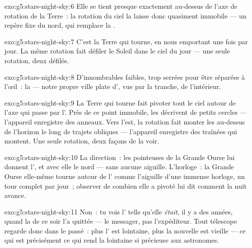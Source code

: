 \begin{solution}{exo:g5:stars-night-sky:6}
Elle se tient presque exactement au-dessus de l'axe de rotation de la
Terre~: la rotation du ciel la laisse donc quasiment immobile --- un
repère fixe du nord, qui remplace la .
\end{solution}

\begin{solution}{exo:g5:stars-night-sky:7}
C'est la Terre qui tourne, en nous emportant une fois par jour. La
même rotation fait défiler le Soleil dans le ciel du jour --- une
seule rotation, deux défilés.
\end{solution}

\begin{solution}{exo:g5:stars-night-sky:8}
D'innombrables  faibles, trop serrées pour être séparées à
l'œil~: la  --- notre propre ville plate d', vue
par la tranche, de l'intérieur.
\end{solution}

\begin{solution}{exo:g5:stars-night-sky:9}
La Terre qui tourne fait pivoter tout le ciel autour de l'axe qui
passe par l'. Près de ce point immobile, les 
décrivent de petits cercles --- l'appareil enregistre des anneaux.
Vers l'est, la rotation fait monter les  au-dessus de
l'horizon le long de trajets obliques --- l'appareil enregistre des
traînées qui montent. Une seule rotation, deux façons de la voir.
\end{solution}

\begin{solution}{exo:g5:stars-night-sky:10}
La direction~: les pointeuses de la Grande Ourse lui donnent l', et avec elle le nord --- sans aucune aiguille. L'horloge~:
la Grande Ourse elle-même tourne autour de l' comme
l'aiguille d'une immense horloge, un tour complet par jour~; observer
de combien elle a pivoté lui dit comment la nuit avance.
\end{solution}

\begin{solution}{exo:g5:stars-night-sky:11}
Non~: tu vois l' telle qu'elle \emph{était}, il y a des années,
quand la  de ce soir l'a quittée --- le messager, pas
l'expéditeur. Tout télescope regarde donc dans le passé~: plus
l' est lointaine, plus la nouvelle est vieille --- ce qui est
précisément ce qui rend la  lointaine si précieuse aux
astronomes.
\end{solution}
